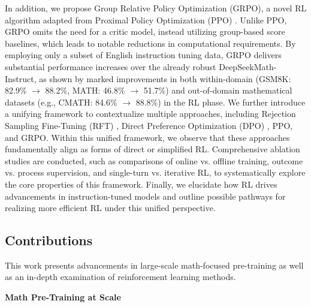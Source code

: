 In addition, we propose Group Relative Policy Optimization (GRPO), a novel RL algorithm adapted from Proximal Policy Optimization (PPO) \citep{schulman2017proximal}. Unlike PPO, GRPO omits the need for a critic model, instead utilizing group-based score baselines, which leads to notable reductions in computational requirements. By employing only a subset of English instruction tuning data, GRPO delivers substantial performance increases over the already robust DeepSeekMath-Instruct, as shown by marked improvements in both within-domain (GSM8K: 82.9\% $\rightarrow$ 88.2\%, MATH: 46.8\% $\rightarrow$ 51.7\%) and out-of-domain mathematical datasets (e.g., CMATH: 84.6\% $\rightarrow$ 88.8\%) in the RL phase. We further introduce a unifying framework to contextualize multiple approaches, including Rejection Sampling Fine-Tuning (RFT) \citep{yuan2023scaling}, Direct Preference Optimization (DPO) \citep{dpo}, PPO, and GRPO. Within this unified framework, we observe that these approaches fundamentally align as forms of direct or simplified RL. Comprehensive ablation studies are conducted, such as comparisons of online vs. offline training, outcome vs. process supervision, and single-turn vs. iterative RL, to systematically explore the core properties of this framework. Finally, we elucidate how RL drives advancements in instruction-tuned models and outline possible pathways for realizing more efficient RL under this unified perspective.

\subsection{Contributions}
This work presents advancements in large-scale math-focused pre-training as well as an in-depth examination of reinforcement learning methods.

\textbf{Math Pre-Training at Scale}

